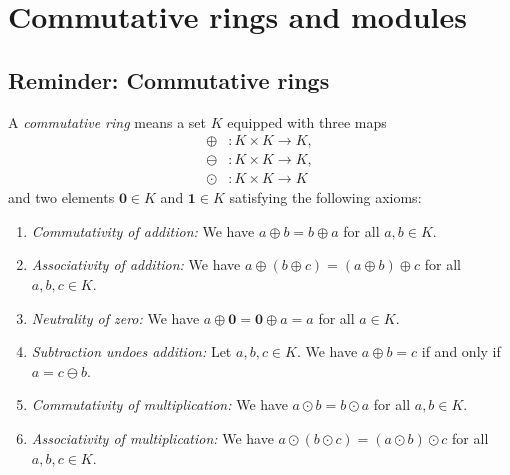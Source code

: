 \section{Commutative rings and modules}

\subsection{Reminder: Commutative rings}

\begin{definition}
\label{def.alg.commring}
\leantarget
\leanok
A \emph{commutative ring} means a set $K$ equipped
with three maps%
\begin{align*}
\oplus &  :K\times K\rightarrow K,\\
\ominus &  :K\times K\rightarrow K,\\
\odot &  :K\times K\rightarrow K
\end{align*}
and two elements $\mathbf{0}\in K$ and $\mathbf{1}\in K$ satisfying the
following axioms:

\begin{enumerate}
\item \emph{Commutativity of addition:} We have $a\oplus b=b\oplus a$ for all
$a,b\in K$.

\item \emph{Associativity of addition:} We have $a\oplus\left(  b\oplus
c\right)  =\left(  a\oplus b\right)  \oplus c$ for all $a,b,c\in K$.

\item \emph{Neutrality of zero:} We have $a\oplus\mathbf{0}=\mathbf{0}\oplus
a=a$ for all $a\in K$.

\item \emph{Subtraction undoes addition:} Let $a,b,c\in K$. We have $a\oplus
b=c$ if and only if $a=c\ominus b$.

\item \emph{Commutativity of multiplication:} We have $a\odot b=b\odot a$ for
all $a,b\in K$.

\item \emph{Associativity of multiplication:} We have $a\odot\left(  b\odot
c\right)  =\left(  a\odot b\right)  \odot c$ for all $a,b,c\in K$.


\end{enumerate}
\end{definition}

